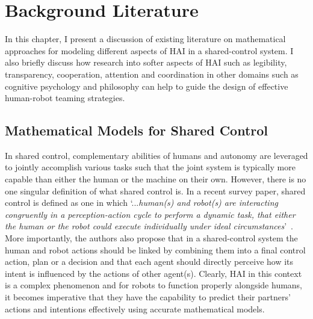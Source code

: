 \documentclass[12pt]{article}
\newcommand{\DGc}[1]{{\textbf{\color{blue}{#1}}}}
\begin{document}
\pagebreak

\section{Background Literature}
\label{sec:HRI_SA}

In this chapter, I present a discussion of existing literature on mathematical approaches for modeling different aspects of HAI in a shared-control system.  
I also briefly discuss how research into softer aspects of HAI such as legibility, transparency, cooperation, attention and coordination in other domains such as cognitive psychology and philosophy can help to guide the design of effective human-robot teaming strategies. 


\subsection{Mathematical Models for Shared Control}
In shared control, complementary abilities of humans and autonomy are leveraged to jointly accomplish various tasks such that the joint system is typically more capable than either the human or the machine on their own. However, there is no one singular definition of what shared control is. In a recent survey paper, shared control is defined as one in which `...\textit{human(s) and robot(s) are interacting congruently in a perception-action cycle to perform a dynamic task, that either the human or the robot could execute individually under ideal circumstances}'~\cite{abbink2018topology}. More importantly, the authors also propose that in a shared-control system the human and robot actions should be linked by combining them into a final control action, plan or a decision and that each agent should directly perceive how its intent is influenced by the actions of other agent(s). Clearly, HAI in this context is a complex phenomenon and for robots to function properly alongside humans, it becomes imperative that they have the capability to predict their partners' actions and intentions effectively using accurate mathematical models. 
\end{document}
